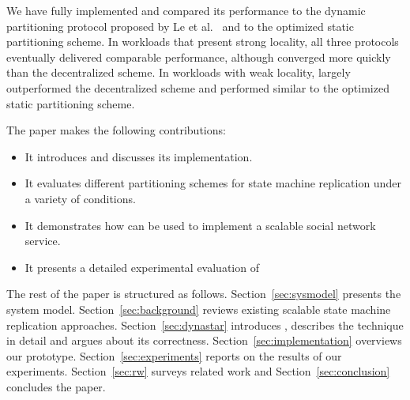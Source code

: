 {%

We have fully implemented \dynastar and compared its performance to
the dynamic partitioning protocol proposed by Le et
al.~\cite{hoang2016} and to the optimized static partitioning scheme.
In workloads that present strong
locality, all three protocols eventually delivered comparable
performance, although \dynastar converged more quickly than the
decentralized scheme.  In workloads with weak locality,
\dynastar largely outperformed the decentralized scheme and performed
similar to the optimized static partitioning scheme.


The paper makes the following contributions:
\begin{itemize}
\item It introduces \dynastar and discusses its implementation. 
\item It evaluates different partitioning schemes for state machine replication under a variety of conditions.
\item It demonstrates how \dynastar can be used to implement a scalable social network service.
\item It presents a detailed experimental evaluation of \dynastar
\end{itemize}

The rest of the paper is structured as follows.
Section~\ref{sec:sysmodel} presents the system model.
Section~\ref{sec:background} reviews existing scalable state machine replication approaches.
Section~\ref{sec:dynastar} introduces \dynastar, describes the technique in detail and argues about its correctness.
Section~\ref{sec:implementation} overviews our prototype.
Section~\ref{sec:experiments} reports on the results of our experiments.
Section~\ref{sec:rw} surveys related work and
Section~\ref{sec:conclusion} concludes the paper.




}
